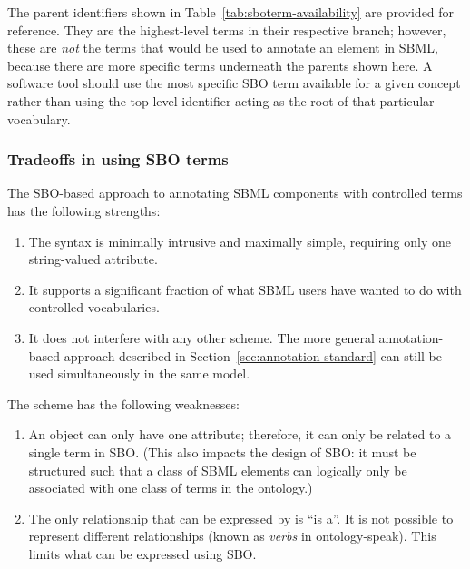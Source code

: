 The parent identifiers shown in
Table~\ref{tab:sboterm-availability} are provided for reference.
They are the highest-level terms in their respective branch;
however, these are \emph{not} the terms that would be used to
annotate an element in SBML, because there are more specific terms
underneath the parents shown here.  A software tool should use the
most specific SBO term available for a given concept rather than
using the top-level identifier acting as the root of that
particular vocabulary.




\subsubsection{Tradeoffs in using SBO terms}

The SBO-based approach to annotating SBML components with
controlled terms has the following strengths:
\begin{enumerate}

\item The syntax is minimally intrusive and maximally simple,
  requiring only one string-valued attribute.

\item It supports a significant fraction of what SBML users have wanted
  to do with controlled vocabularies.

\item It does not interfere with any other scheme.  The more
  general annotation-based approach described in
  Section~\ref{sec:annotation-standard} can still be used
  simultaneously in the same model.

\end{enumerate}

The scheme has the following weaknesses:
\begin{enumerate}

\item An object can only have one  attribute;
  therefore, it can only be related to a single term in SBO.
  (This also impacts the design of SBO: it must be structured such
  that a class of SBML elements can logically only be associated
  with one class of terms in the ontology.)

\item The only relationship that can be expressed by
   is ``is a''.  It is not possible to represent
  different relationships (known as \emph{verbs} in
  ontology-speak).  This limits what can be expressed using SBO.

\end{enumerate}


